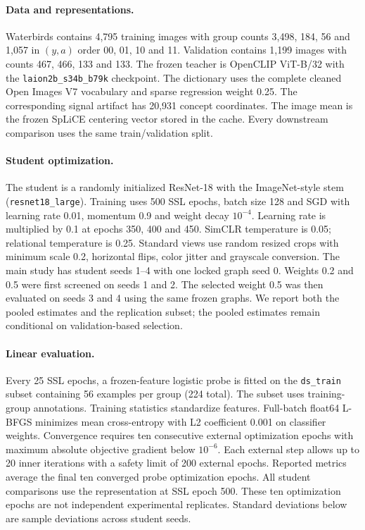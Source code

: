 \documentclass{article}
\begin{document}
\paragraph{Data and representations.}
Waterbirds contains 4,795 training images with group counts 3,498, 184, 56 and
1,057 in $(y,a)$ order 00, 01, 10 and 11. Validation contains 1,199 images with
counts 467, 466, 133 and 133. The frozen teacher is OpenCLIP ViT-B/32 with the
\texttt{laion2b\_s34b\_b79k} checkpoint. The dictionary uses the complete cleaned
Open Images V7 vocabulary and sparse regression weight 0.25. The corresponding
signal artifact has 20,931 concept coordinates. The image mean is the frozen
SpLiCE centering vector stored in the cache. Every downstream comparison uses
the same train/validation split.

\paragraph{Student optimization.}
The student is a randomly initialized ResNet-18 with the ImageNet-style stem
(\texttt{resnet18\_large}). Training uses 500 SSL epochs, batch size 128 and SGD
with learning rate 0.01, momentum 0.9 and weight decay $10^{-4}$. Learning rate
is multiplied by 0.1 at epochs 350, 400 and 450. SimCLR temperature is 0.05;
relational temperature is 0.25. Standard views use random resized crops with
minimum scale 0.2, horizontal flips, color jitter and grayscale conversion.
The main study has student seeds 1--4 with one locked graph seed 0.
Weights 0.2 and 0.5 were first screened on seeds 1 and 2. The selected weight
0.5 was then evaluated on seeds 3 and 4 using the same frozen graphs. We report
both the pooled estimates and the replication subset; the pooled estimates
remain conditional on validation-based selection.

\paragraph{Linear evaluation.}
Every 25 SSL epochs, a frozen-feature logistic probe is fitted on the
\texttt{ds\_train} subset containing 56 examples per group (224 total).
The subset uses training-group annotations. Training statistics standardize
features. Full-batch float64 L-BFGS minimizes mean cross-entropy with L2
coefficient 0.001 on classifier weights. Convergence requires ten consecutive
external optimization epochs with maximum absolute objective gradient below
$10^{-6}$. Each external step allows up to 20 inner iterations with a safety
limit of 200 external epochs. Reported metrics average the final ten converged
probe optimization epochs. All student comparisons use the representation at SSL
epoch 500. These ten optimization epochs are not independent experimental
replicates. Standard deviations below are sample deviations across student seeds.
\end{document}
